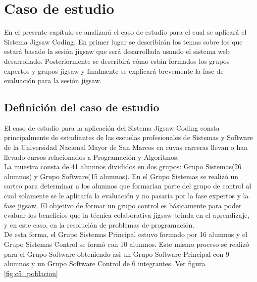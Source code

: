 \chapter{Caso de estudio}
\label{cap:caso_de_estudio}
En el presente capítulo se analizará el caso de estudio para el cual se aplicará el Sistema Jigsaw Coding. En primer lugar se describirán los temas sobre los que estará basado la sesión jigsaw que será desarrollada usando el sistema web desarrollado. Posteriormente se describirá cómo están formados los grupos expertos y grupos jigsaw y finalmente se explicará brevemente la fase de evaluación para la sesión jigsaw.

\section{Definición del caso de estudio}
El caso de estudio para la aplicación del Sistema Jigsaw Coding consta principalmente de estudiantes de las escuelas profesionales de Sistemas y Software de la Universidad Nacional Mayor de San Marcos en cuyas carreras llevan o han llevado cursos relacionados a Programación y Algoritmos. \\

La muestra consta de 41 alumnos divididos en dos grupos: Grupo Sistemas(26 alumnos) y Grupo Software(15 alumnos). En el Grupo Sistemas se realizó un sorteo para determinar a los alumnos que formarían parte del grupo de control al cual solamente se le aplicaría la evaluación y no pasaría por la fase expertos y la fase jigsaw. El objetivo de formar un grupo control es básicamente para poder evaluar los beneficios que la técnica colaborativa jigsaw brinda en el aprendizaje, y en este caso, en la resolución de problemas de programación.\\

De esta forma, el Grupo Sistemas Principal estuvo formado por 16 alumnos y el Grupo Sistemas Control se formó con 10 alumnos. Este mismo proceso se realizó para el Grupo Software obteniendo asi un Grupo Software Principal con 9 alumnos y un Grupo Software Control de 6 integrantes. Ver figura \autoref{fig:c5_poblacion}\\

